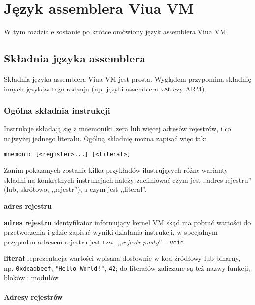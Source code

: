 \chapter{Język assemblera Viua VM}
\label{appendix_viua_vm_assembly_language}

W tym rozdziale zostanie po krótce omówiony język assemblera Viua VM.

\section{Składnia języka assemblera}

Składnia języka assemblera Viua VM jest prosta. Wyglądem przypomina składnię innych języków tego rodzaju
(np. języki assemblera x86 czy ARM).

\subsection{Ogólna składnia instrukcji}

Instrukcje składają się z mnemoniki, zera lub więcej adresów rejestrów, i co najwyżej jednego literału. Ogólną składnię można zapisać więc tak:

\begin{lstlisting}
mnemonic [<register>...] [<literal>]
\end{lstlisting}

Zanim pokazanych zostanie kilka przykładów ilustrujących różne warianty składni na konkretnych instrukcjach
należy zdefiniować czym jest ,,adres rejestru'' (lub, skrótowo, ,,rejestr''), a czym jest ,,literał''.

\begin{labeling}{\textbf{adres rejestru}}
	\item[\textbf{adres rejestru}] identyfikator informujący kernel VM skąd ma pobrać wartości do
		przetworzenia i gdzie zapisać wyniki działania instrukcji, w specjalnym przypadku adresem rejestru
		jest tzw. ,,\emph{rejestr pusty}'' -- \texttt{void}
	\item[\textbf{literał}] reprezentacja wartości wpisana dosłownie w kod źródłowy lub binarny,
		np. \texttt{0xdeadbeef}, \texttt{"Hello World!"}, \texttt{42}; do literałów zaliczane są też nazwy
		funkcji, bloków i modułów
\end{labeling}

\subsubsection{Adresy rejestrów}

